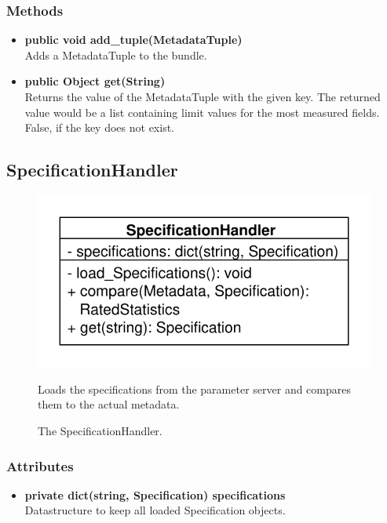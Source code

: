 \subsubsection{Methods}
\begin{itemize}
	\item \textbf{public void add\_tuple(MetadataTuple)}\\
	Adds a MetadataTuple to the bundle.
	\item \textbf{public Object get(String)}\\
	Returns the value of the MetadataTuple with the given key. The returned value would be a list containing limit values for the most measured fields. False, if the key does not exist.
\end{itemize}

\newpage
\subsection{SpecificationHandler}
\begin{figure}[htbp]
	\begin{minipage}[t]{7cm}
		\vspace{0pt}
		\centering
		\includegraphics[scale=0.6]{./diagram_pictures/SpecificationHandler.pdf}
		\caption{The SpecificationHandler.}
	\end{minipage}
	\hfill
	\begin{minipage}[t]{8cm}
		\vspace{10pt}
		Loads the specifications from the parameter server and compares them to the actual metadata.
	\end{minipage}
\end{figure}

\subsubsection{Attributes}
\begin{itemize}
	\item \textbf{private dict(string, Specification) specifications}\\
	Datastructure to keep all loaded Specification objects.
\end{itemize}
